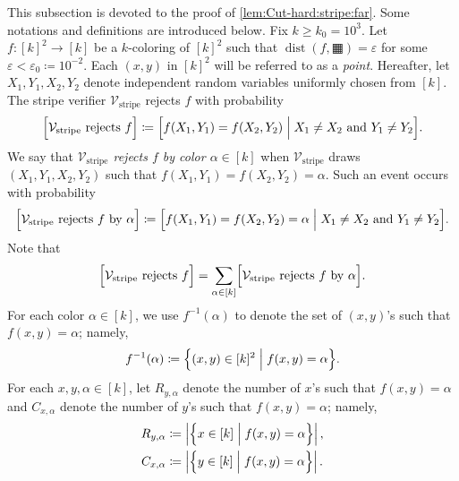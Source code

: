 \documentclass[11pt,fleqn]{article}
\renewcommand{\geq}{\geqslant}
\renewcommand{\epsilon}{\varepsilon}
\newcommand{\defeq}{\coloneq}
\DeclareMathOperator{\rHam}{\mathrm{dist}}
\newcommand{\V}{\calV}
\newcommand{\f}{f}
\newcommand{\kzero}{10^3}
\newcommand{\epsilonzero}{10^{-2}}
\newcommand{\str}{\squarehvfill}
\newcommand{\Vstripe}{\V_\mathrm{stripe}}
\newcommand{\calV}{\mathcal{V}}
\let\Pr\relax\DeclareMathOperator*{\Pr}{\mathbb{P}}
\theoremstyle{definition}
\numberwithin{equation}{section}
\begin{document}
This subsection is devoted to the proof of \cref{lem:Cut-hard:stripe:far}.
Some notations and definitions are introduced below.
Fix $k \geq k_0 = \kzero$.
Let $\f \colon [k]^2 \to [k]$ be a $k$-coloring of $[k]^2$ such that
$\rHam(\f,\str) = \epsilon$
for some $\epsilon < \epsilon_0 \defeq \epsilonzero$.
Each $(x,y)$ in $[k]^2$ will be referred to as a \emph{point}.
Hereafter, let $X_1,Y_1,X_2,Y_2$ denote independent random variables uniformly chosen from $[k]$.
The stripe verifier $\Vstripe$ rejects $\f$ with probability
\begin{align}
    \Pr\Bigl[ \Vstripe \text{ rejects } \f \Bigr] \defeq
    \Pr\Bigl[
        \f(X_1,Y_1) = \f(X_2,Y_2) \Bigm| X_1 \neq X_2 \text{ and } Y_1 \neq Y_2
    \Bigr].
\end{align}
We say that \emph{$\Vstripe$ rejects $\f$ by color $\alpha \in [k]$} when
    $\Vstripe$ draws $(X_1,Y_1,X_2,Y_2)$ such that
    $\f(X_1,Y_1) = \f(X_2,Y_2) = \alpha$.
Such an event occurs with probability
\begin{align}
    \Pr\Bigl[ \Vstripe \text{ rejects } \f \text{ by } \alpha \Bigr]
    \defeq \Pr\Bigl[
        \f(X_1,Y_1) = \f(X_2,Y_2) = \alpha \Bigm| X_1 \neq X_2 \text{ and } Y_1 \neq Y_2
    \Bigr].
\end{align}
Note that
\begin{align}
    \Pr\Bigl[ \Vstripe \text{ rejects } \f \Bigr]
    = \sum_{\alpha \in [k]} \Pr\Bigl[ \Vstripe \text{ rejects } \f \text{ by } \alpha \Bigr].
\end{align}
For each color $\alpha \in [k]$, 
we use $\f^{-1}(\alpha)$ to denote the set of $(x,y)$'s such that $\f(x,y) = \alpha$; namely,
\begin{align}
    \f^{-1}(\alpha) \defeq \Bigl\{
        (x,y) \in [k]^2 \Bigm| \f(x,y) = \alpha
    \Bigr\}.
\end{align}
For each $x,y,\alpha \in [k]$, let
$R_{y,\alpha}$ denote the number of $x$'s such that $\f(x,y) = \alpha$ and
$C_{x,\alpha}$ denote the number of $y$'s such that $\f(x,y) = \alpha$; namely,
\begin{align}
\begin{aligned}
    R_{y,\alpha} & \defeq 
        \left|\Bigl\{ x \in [k] \Bigm| \f(x,y) = \alpha \Bigr\}\right|, \\
    C_{x,\alpha} & \defeq
        \left|\Bigl\{ y \in [k] \Bigm| \f(x,y) = \alpha \Bigr\}\right|.
\end{aligned}
\end{align}
\end{document}
